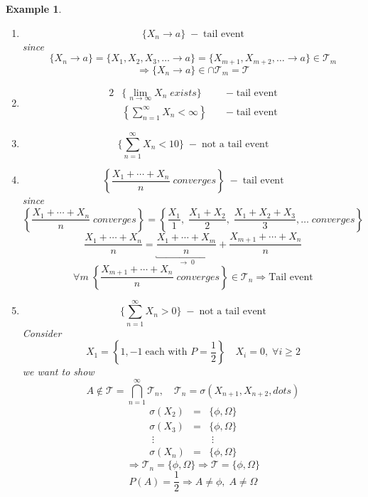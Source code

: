 \documentclass[12pt]{article}
\newtheorem{example}{Example}[section]
\begin{document}
\begin{example}\label{01}\quad \\
\begin{enumerate}
\item \[\{X_n \rightarrow a\} \; - \; \text{tail event}\]
since
\[\{X_n \rightarrow a\} = \{X_1, X_2, X_3,\dots \rightarrow a\} = \{X_{m+1}, X_{m+2}, \dots \rightarrow a\} \in \mathcal{T}_m\]
\[\Rightarrow \{X_n \rightarrow a\} \in \cap \mathcal{T}_m = \mathcal{T}\]
\item
\begin{alignat*}{2}
&\{\lim_{n\rightarrow \infty}X_n \; exists\} &\; &- \; \text{tail event}\\
&\left\{\sum\limits_{n=1}^{\infty}X_n < \infty\right\} &\; &-  \; \text{tail event}
\end{alignat*}
\item \[\{\sum\limits_{n=1}^{\infty}X_n < 10\} \; -  \; \text{not a tail event} \]
\item \[\left\{\frac{X_1 + \cdots +X_n }{n} \; converges\right\} \; -  \; \text{tail event}\]
since
\[\left\{\frac{X_1 + \cdots +X_n }{n} \; converges\right\} = \left\{\frac{X_1 }{1}, \; \frac{X_1 + X_2 }{2}, \;\frac{X_1+ X_2 +X_3 }{3}, \dots \; converges\right\}\]
\[\frac{X_1 + \cdots +X_n }{n} = \underbracket{\frac{X_1 + \cdots +X_m }{n}}_{\rightarrow \; 0} + \frac{X_{m+1} + \cdots +X_n }{n}\]
\[ \forall m \; \left\{\frac{X_{m+1} + \cdots +X_n }{n} \; converges\right\} \in \mathcal{T}_n \Rightarrow \text{Tail event}\]
\item \[\{\sum\limits_{n=1}^{\infty}X_n >0\} \; -  \; \text{not a tail event} \]
Consider 
\[X_1 = \left\{1,-1 \; \text{each with }P=\frac{1}{2}\right\} \quad X_i = 0, \; \forall i \geq 2\]
we want to show 
\[A \notin \mathcal{T} = \bigcap_{n=1}^{\infty}\mathcal{T}_n, \quad \mathcal{T}_n = \sigma(X_{n+1}, X_{n+2}, dots )\]
\[\begin{array}{ccc}
\sigma(X_2) &= &\{\phi , \Omega\}\\
\sigma(X_3) &= &\{\phi , \Omega\}\\
\; \vdots & & \; \vdots\\
\sigma(X_n) &= &\{\phi , \Omega\}
\end{array}\]
\[\Rightarrow \mathcal{T}_n = \{\phi , \Omega\} \Rightarrow  \mathcal{T}= \{\phi , \Omega\} \]
\[P(A)= \frac{1}{2} \Rightarrow A\neq \phi, \; A \neq \Omega \]
\end{enumerate}
\end{example}
\end{document}
